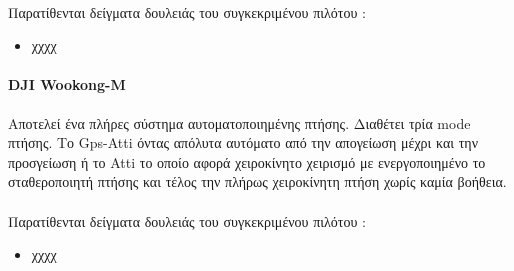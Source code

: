 \documentclass[a4paper, 12pt, twoside]{report}
\begin{document}
{{{{{{			\paragraph{}{Παρατίθενται δείγματα δουλειάς του συγκεκριμένου πιλότου :
				\begin{itemize}
					\item \href{χχχχ}{χχχχ}
					
				\end{itemize}
			}
			
			\paragraph{DJI Wookong-M}{Αποτελεί ένα πλήρες σύστημα αυτοματοποιημένης πτήσης. Διαθέτει τρία mode πτήσης. Το Gps-Atti όντας απόλυτα αυτόματο από την απογείωση μέχρι και την προσγείωση ή το Atti το οποίο αφορά χειροκίνητο χειρισμό με ενεργοποιημένο το σταθεροποιητή πτήσης και τέλος την πλήρως χειροκίνητη πτήση χωρίς καμία βοήθεια.
			}
			\paragraph{}{Παρατίθενται δείγματα δουλειάς του συγκεκριμένου πιλότου :
				\begin{itemize}
					\item \href{χχχχ}{χχχχ}
					
				\end{itemize}
			}
			
			\begin{landscape}	
			\setlength\LTleft{0pt}            %
			\setlength\LTright{0pt}           %
	

\end{landscape}}}}}}}
\end{document}
